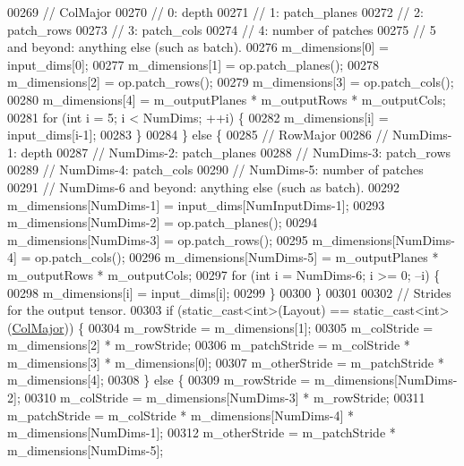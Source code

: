 \begin{DoxyCode}
00269       \textcolor{comment}{// ColMajor}
00270       \textcolor{comment}{// 0: depth}
00271       \textcolor{comment}{// 1: patch\_planes}
00272       \textcolor{comment}{// 2: patch\_rows}
00273       \textcolor{comment}{// 3: patch\_cols}
00274       \textcolor{comment}{// 4: number of patches}
00275       \textcolor{comment}{// 5 and beyond: anything else (such as batch).}
00276       m\_dimensions[0] = input\_dims[0];
00277       m\_dimensions[1] = op.patch\_planes();
00278       m\_dimensions[2] = op.patch\_rows();
00279       m\_dimensions[3] = op.patch\_cols();
00280       m\_dimensions[4] = m\_outputPlanes * m\_outputRows * m\_outputCols;
00281       \textcolor{keywordflow}{for} (\textcolor{keywordtype}{int} i = 5; i < NumDims; ++i) \{
00282         m\_dimensions[i] = input\_dims[i-1];
00283       \}
00284     \} \textcolor{keywordflow}{else} \{
00285       \textcolor{comment}{// RowMajor}
00286       \textcolor{comment}{// NumDims-1: depth}
00287       \textcolor{comment}{// NumDims-2: patch\_planes}
00288       \textcolor{comment}{// NumDims-3: patch\_rows}
00289       \textcolor{comment}{// NumDims-4: patch\_cols}
00290       \textcolor{comment}{// NumDims-5: number of patches}
00291       \textcolor{comment}{// NumDims-6 and beyond: anything else (such as batch).}
00292       m\_dimensions[NumDims-1] = input\_dims[NumInputDims-1];
00293       m\_dimensions[NumDims-2] = op.patch\_planes();
00294       m\_dimensions[NumDims-3] = op.patch\_rows();
00295       m\_dimensions[NumDims-4] = op.patch\_cols();
00296       m\_dimensions[NumDims-5] = m\_outputPlanes * m\_outputRows * m\_outputCols;
00297       \textcolor{keywordflow}{for} (\textcolor{keywordtype}{int} i = NumDims-6; i >= 0; --i) \{
00298         m\_dimensions[i] = input\_dims[i];
00299       \}
00300     \}
00301 
00302     \textcolor{comment}{// Strides for the output tensor.}
00303     \textcolor{keywordflow}{if} (static\_cast<int>(Layout) == static\_cast<int>(\hyperlink{group__enums_ggaacded1a18ae58b0f554751f6cdf9eb13a0cbd4bdd0abcfc0224c5fcb5e4f6669a}{ColMajor})) \{
00304       m\_rowStride = m\_dimensions[1];
00305       m\_colStride = m\_dimensions[2] * m\_rowStride;
00306       m\_patchStride = m\_colStride * m\_dimensions[3] * m\_dimensions[0];
00307       m\_otherStride = m\_patchStride * m\_dimensions[4];
00308     \} \textcolor{keywordflow}{else} \{
00309       m\_rowStride = m\_dimensions[NumDims-2];
00310       m\_colStride = m\_dimensions[NumDims-3] * m\_rowStride;
00311       m\_patchStride = m\_colStride * m\_dimensions[NumDims-4] * m\_dimensions[NumDims-1];
00312       m\_otherStride = m\_patchStride * m\_dimensions[NumDims-5];

\end{DoxyCode}
